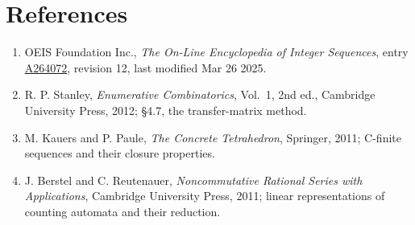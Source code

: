 \documentclass[11pt]{article}
\theoremstyle{definition}
\begin{document}
\section{References}

\begin{enumerate}

\item OEIS Foundation Inc., \emph{The On-Line Encyclopedia of Integer Sequences}, entry \href{https://oeis.org/A264072}{A264072}, revision 12, last modified Mar 26 2025.

\item R. P. Stanley, \emph{Enumerative Combinatorics}, Vol.~1, 2nd ed., Cambridge University Press, 2012; \S4.7, the transfer-matrix method.

\item M. Kauers and P. Paule, \emph{The Concrete Tetrahedron}, Springer, 2011; C-finite sequences and their closure properties.

\item J. Berstel and C. Reutenauer, \emph{Noncommutative Rational Series with Applications}, Cambridge University Press, 2011; linear representations of counting automata and their reduction.

\end{enumerate}
\end{document}
